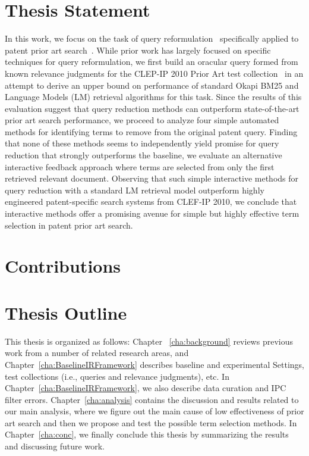 \section{Thesis Statement}
\label{sec:thesisstatement}
In this work, we focus on the task of query
reformulation~\citep{Baeza-Yates2011} specifically applied to patent
prior art
search~\citep{mahdabi2014patent,Piroi2010,xue2009transforming}.  While
prior work has largely focused on specific techniques for query
reformulation, 
 we first
build an oracular query formed from known relevance judgments for the
CLEP-IP 2010 Prior Art test collection~\citep{Piroi2010} in an attempt
to derive an upper bound on performance of standard Okapi BM25 and
Language Models (LM) retrieval algorithms for this task.  Since the
results of this evaluation suggest that query reduction methods can
outperform state-of-the-art prior art search performance, 
we proceed to analyze four simple
automated methods for identifying terms to remove from the original
patent query.  Finding that none of these methods seems to
independently yield promise for query reduction that strongly
outperforms the baseline, 
we evaluate an alternative
interactive feedback approach where terms are selected from only the
first retrieved relevant document.  Observing that such simple
interactive methods for query reduction with a standard LM retrieval
model outperform highly engineered patent-specific search systems from
CLEF-IP 2010, we conclude that interactive methods offer a promising
avenue for simple but highly effective term selection in patent prior
art search.

\section{Contributions}
\label{sec:Contributions}

\section{Thesis Outline}
\label{sec:outline}
This thesis is organized as follows: Chapter ~\ref{cha:background} reviews previous work from a number
of related research areas, and Chapter~\ref{cha:BaselineIRFramework} describes baseline and experimental Settings, 
test collections (i.e., queries and relevance judgments),
etc. In Chapter~\ref{cha:BaselineIRFramework}, we also describe data curation and IPC filter errors.
Chapter~\ref{cha:analysis} contains the discussion and results related to our main analysis, where we figure out 
the main cause of low effectiveness of prior art search and then we propose and test the possible term selection methods. 
In Chapter~\ref{cha:conc}, we finally conclude this thesis by 
summarizing the results and discussing future work.



